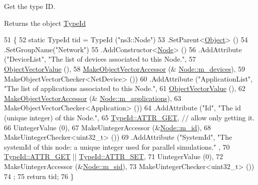 Get the type ID. 

\begin{DoxyReturn}{Returns}
the object \hyperlink{classns3_1_1TypeId}{Type\+Id} 
\end{DoxyReturn}

\begin{DoxyCode}
51 \{
52   \textcolor{keyword}{static} TypeId tid = TypeId (\textcolor{stringliteral}{"ns3::Node"})
53     .SetParent<\hyperlink{classns3_1_1Object_a40860402e64d8008fb42329df7097cdb}{Object}> ()
54     .SetGroupName(\textcolor{stringliteral}{"Network"})
55     .AddConstructor<\hyperlink{classns3_1_1Node_acafd181365f06486940e936c90e90e21}{Node}> ()
56     .AddAttribute (\textcolor{stringliteral}{"DeviceList"}, \textcolor{stringliteral}{"The list of devices associated to this Node."},
57                    \hyperlink{namespacens3_a5de726d8bcea7a51fd68ce5167a66713}{ObjectVectorValue} (),
58                    \hyperlink{namespacens3_a6ad5b3621a5dc72b7030cbb07c73adf6}{MakeObjectVectorAccessor} (&
      \hyperlink{classns3_1_1Node_af0ba0670e62825e6953317a7a028aa40}{Node::m\_devices}),
59                    MakeObjectVectorChecker<NetDevice> ())
60     .AddAttribute (\textcolor{stringliteral}{"ApplicationList"}, \textcolor{stringliteral}{"The list of applications associated to this Node."},
61                    \hyperlink{namespacens3_a5de726d8bcea7a51fd68ce5167a66713}{ObjectVectorValue} (),
62                    \hyperlink{namespacens3_a6ad5b3621a5dc72b7030cbb07c73adf6}{MakeObjectVectorAccessor} (&
      \hyperlink{classns3_1_1Node_a3984bdbc05cc8a6d2eda6c41963f16f6}{Node::m\_applications}),
63                    MakeObjectVectorChecker<Application> ())
64     .AddAttribute (\textcolor{stringliteral}{"Id"}, \textcolor{stringliteral}{"The id (unique integer) of this Node."},
65                    \hyperlink{classns3_1_1TypeId_a3ab7b43b95f96391c514d609ca60e542a3dd4b476c9b257285c177d6c414b5fd0}{TypeId::ATTR\_GET}, \textcolor{comment}{// allow only getting it.}
66                    UintegerValue (0),
67                    MakeUintegerAccessor (&\hyperlink{classns3_1_1Node_a4aedbd7c03591acdcf48a4f79818dba1}{Node::m\_id}),
68                    MakeUintegerChecker<uint32\_t> ())
69     .AddAttribute (\textcolor{stringliteral}{"SystemId"}, \textcolor{stringliteral}{"The systemId of this node: a unique integer used for parallel simulations."}
      ,
70                    \hyperlink{classns3_1_1TypeId_a3ab7b43b95f96391c514d609ca60e542a3dd4b476c9b257285c177d6c414b5fd0}{TypeId::ATTR\_GET} || \hyperlink{classns3_1_1TypeId_a3ab7b43b95f96391c514d609ca60e542aa860aabfc04fde3f5fd95529cb706d9e}{TypeId::ATTR\_SET},
71                    UintegerValue (0),
72                    MakeUintegerAccessor (&\hyperlink{classns3_1_1Node_aa6c9e7e8168f6da55df608b5a884b112}{Node::m\_sid}),
73                    MakeUintegerChecker<uint32\_t> ())
74   ;
75   \textcolor{keywordflow}{return} tid;
76 \}
\end{DoxyCode}


